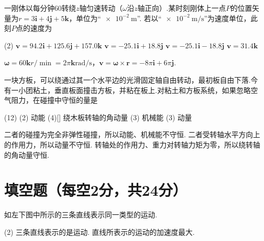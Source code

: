 \begin{problem} %
    一刚体以每分钟$60$转绕$z$轴匀速转动（$\omega$沿$z$轴正向）.某时刻刚体上一点$P$的位置矢量为$r=3\bm i+4\bm j+5\bm k$，单位为``$\qty{e-2}\m$''. 若以``$\qty{e-2}{\m/\s}$''为速度单位，此刻$P$点的速度为
    \begin{tasks}(2)
        \task $\bm v=94.2\bm i+125.6\bm j+157.0\bm k$
        \task[\true] $\bm v=-25.1\bm i+18.8\bm j$
        \task $\bm v=-25.1\bm i-18.8\bm j$
        \task $\bm v=31.4\bm k$
    \end{tasks}
\end{problem}
\begin{solution}
    $\bm\omega=60\bm k\unit{r/\min}=2\pi\bm k\unit{\radian/\s}$，$\bm v=\bm\omega\times\bm r=-8\pi\bm i+6\pi\bm j$.
\end{solution}

\begin{problem} %
    一块方板，可以绕通过其一个水平边的光滑固定轴自由转动，最初板自由下落.今有一小团粘土，垂直板面撞击方板，并粘在板上.对粘土和方板系统，如果忽略空气阻力，在碰撞中守恒的量是
    \begin{tasks}(12)
        \task*(2) 动能
        \task*(4)[\true] 绕木板转轴的角动量
        \task*(3) 机械能
        \task*(3) 动量
    \end{tasks}
\end{problem}
\begin{solution}
    二者的碰撞为完全非弹性碰撞，所以动能、机械能不守恒. 二者受转轴水平方向上的作用力，所以动量不守恒. 转轴处的作用力、重力对转轴力矩为零，所以绕转轴的角动量守恒.
\end{solution}

\section{填空题（每空2分，共24分）}

\begin{problem} %
    如左下图中所示的三条直线表示同一类型的运动.
    \begin{tasks}[label=\arabic*.](2)
        \task 三条直线表示的是运动.
        \task {}直线所表示的运动的加速度最大.
    \end{tasks}      
\end{problem}


